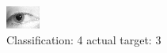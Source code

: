 \begin{figure}[h!]
\begin{center}
\includegraphics[width=0.60\columnwidth]{figures/ID1331_class_4_target_3.png}
\end{center}
\caption{ Classification: 4 actual target: 3}
\label{fig:ID1331_class_4_target_3}
\end{figure}
